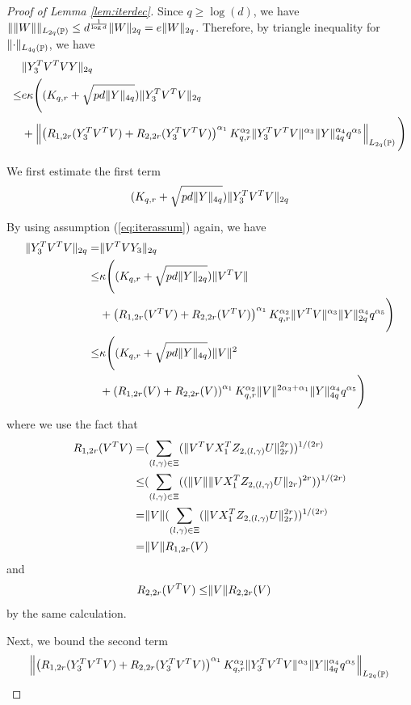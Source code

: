 \documentclass[11pt]{amsart}
\numberwithin{equation}{section}
\numberwithin{equation}{section}
\DeclareMathOperator{\Pb}{\mathbb{P}}
\DeclarePairedDelimiter{\norm}{\lVert}{\rVert}
\newcommand{\norml}[1]{\left\lVert#1\right\rVert}
\begin{document}
\begin{proof}[Proof of Lemma \ref{lem:iterdec}]
Since $q \ge \log(d)$, we have $\norm{\norm{W}}_{L_{2q}(\Pb)}  \le d^{\frac{1}{\log d}} \norm{W}_{2q}= e \norm{W}_{2q}$. Therefore, by triangle inequality for $\norm{\cdot}_{L_{4q}(\Pb)}$, we have
    \begin{align*}
    &\norm{Y_3^TV^TVY}_{2q} \\\le& e\kappa \Bigg((K_{q,r}+\sqrt{pd\norm{Y}_{4q}})\norm{Y_3^TV^TV}_{2q} \\&+ \norml{\left(R_{1,2r}(Y_3^TV^TV)+R_{2,2r}(Y_3^TV^TV)\right)^{\alpha_1}K_{q,r}^{\alpha_2}\norm{Y_3^TV^TV}^{\alpha_3} \norm{Y}_{4q} ^{\alpha_4}q^{\alpha_5}}_{L_{2q}(\Pb)}\Bigg)
\end{align*}


We first estimate the first term
\begin{align*}
    (K_{q,r}+\sqrt{pd\norm{Y}_{4q}})\norm{Y_3^TV^TV}_{2q}
\end{align*}

By using assumption (\ref{eq:iterassum}) again, we have
\begin{align*}
    \norm{Y_3^TV^TV}_{2q}=&\norm{V^TVY_3}_{2q} \\\le& \kappa \Bigg((K_{q,r}+\sqrt{pd\norm{Y}_{2q}})\norm{V^TV} \\&+ \left(R_{1,2r}(V^TV)+R_{2,2r}(V^TV)\right)^{\alpha_1}K_{q,r}^{\alpha_2}\norm{V^TV}^{\alpha_3} \norm{Y}_{2q}^{\alpha_4}q^{\alpha_5}\Bigg)
    \\\le& \kappa \Bigg((K_{q,r}+\sqrt{pd\norm{Y}_{4q}})\norm{V}^2 \\&+ \left(R_{1,2r}(V)+R_{2,2r}(V)\right)^{\alpha_1}K_{q,r}^{\alpha_2}\norm{V}^{2\alpha_3+\alpha_1} \norm{Y}_{4q}^{\alpha_4}q^{\alpha_5}\Bigg)
\end{align*}
where we use the fact that
\begin{align*}
    R_{1,2r}(V^TV)=&(\sum\limits_{(l,\gamma) \in \Xi}(\norm{V^TVX_1^TZ_{2,(l,\gamma)}U}_{2r}^{2r}))^{1/(2r)}
    \\ \le &(\sum\limits_{(l,\gamma) \in \Xi}((\norm{V}\norm{VX_1^TZ_{2,(l,\gamma)}U}_{2r})^{2r}))^{1/(2r)}
    \\ = &\norm{V}(\sum\limits_{(l,\gamma) \in \Xi}(\norm{VX_1^TZ_{2,(l,\gamma)}U}_{2r}^{2r}))^{1/(2r)}
    \\=& \norm{V}R_{1,2r}(V)
\end{align*}
and
\begin{align*}
    R_{2,2r}(V^TV) \le & \norm{V}R_{2,2r}(V)
\end{align*}
by the same calculation.

Next, we bound the second term
\begin{align*}
    \norml{\left(R_{1,2r}(Y_3^TV^TV)+R_{2,2r}(Y_3^TV^TV)\right)^{\alpha_1}K_{q,r}^{\alpha_2}\norm{Y_3^TV^TV}^{\alpha_3} \norm{Y}_{4q} ^{\alpha_4}q^{\alpha_5}}_{L_{2q}(\Pb)}
\end{align*}


\end{proof}
\end{document}
